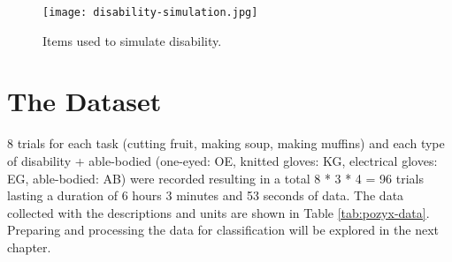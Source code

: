 \begin{figure}[ht]
    \centering
    \texttt{[image: disability-simulation.jpg]}
    \caption{Items used to simulate disability.}
    \label{fig:disability-simulation}
\end{figure}

\section{The Dataset}

8 trials for each task (cutting fruit, making soup, making muffins) and each type of disability + able-bodied (one-eyed: OE, knitted gloves: KG, electrical gloves: EG, able-bodied: AB) were recorded resulting in a total 8 * 3 * 4 = 96 trials lasting a duration of 6 hours 3 minutes and 53 seconds of data. The data collected with the descriptions and units are shown in Table \ref{tab:pozyx-data}. Preparing and processing the data for classification will be explored in the next chapter.

